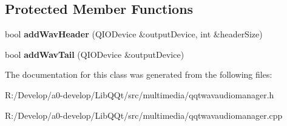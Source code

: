 \subsection*{Protected Member Functions}
\begin{DoxyCompactItemize}
\item 
\mbox{\label{class_q_qt_wav_audio_output_a6a026b004a0c1805b4505d0327e8559f}} 
bool {\bfseries add\+Wav\+Header} (Q\+I\+O\+Device \&output\+Device, int \&header\+Size)
\item 
\mbox{\label{class_q_qt_wav_audio_output_a32c952d0ecdb4c37e438ddfd3ee49477}} 
bool {\bfseries add\+Wav\+Tail} (Q\+I\+O\+Device \&output\+Device)
\end{DoxyCompactItemize}


The documentation for this class was generated from the following files\+:\begin{DoxyCompactItemize}
\item 
R\+:/\+Develop/a0-\/develop/\+Lib\+Q\+Qt/src/multimedia/qqtwavaudiomanager.\+h\item 
R\+:/\+Develop/a0-\/develop/\+Lib\+Q\+Qt/src/multimedia/qqtwavaudiomanager.\+cpp\end{DoxyCompactItemize}
